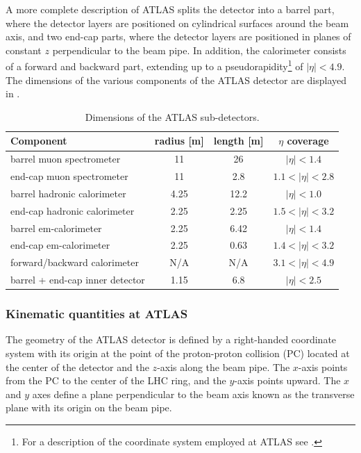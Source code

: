 A more complete description of ATLAS splits the detector
into a barrel part, where the detector layers
are positioned on cylindrical surfaces around the beam axis, and two end-cap parts,
where the detector layers are positioned in planes of constant $z$ perpendicular
to the beam pipe. In addition, the calorimeter consists of a forward 
and backward part, extending up to a pseudorapidity\footnote{For a description
of the coordinate system employed at ATLAS see .} 
of $|\eta| < 4.9$. The dimensions of the various components of the ATLAS detector
are displayed in .

\begin{table}[htbp]
  \begin{center}
    \begin{tabular}{|l|ccc|}
    \hline
    Component & radius [m] & length [m] & $\eta$ coverage \\
    \hline
    barrel muon spectrometer &  11 & 26 & $|\eta| < 1.4$ \\
    end-cap muon spectrometer & 11 & 2.8 & $1.1 < |\eta| < 2.8$ \\
    \hline
    barrel hadronic calorimeter & 4.25 & 12.2 & $|\eta| < 1.0$ \\
    end-cap hadronic calorimeter & 2.25 & 2.25 & $1.5 < |\eta| < 3.2$ \\
    \hline
    barrel em-calorimeter & 2.25 & 6.42 & $|\eta| < 1.4$ \\
    end-cap em-calorimeter & 2.25 & 0.63 & $1.4 < |\eta| < 3.2$ \\
    forward/backward calorimeter & N/A & N/A & $3.1 < |\eta| < 4.9$ \\
    \hline
    barrel + end-cap inner detector & 1.15 & 6.8 & $|\eta| < 2.5$ \\
    \hline
    \end{tabular}
    \caption{Dimensions of the ATLAS sub-detectors.}
    \label{tab:atlasdim}
  \end{center}
\end{table}

\subsubsection{Kinematic quantities at ATLAS}
\label{subsubsec:kinematics}

The geometry of the ATLAS detector is defined
by a right-handed coordinate system with its origin at the point of
the proton-proton collision (PC) located at the center of the detector 
and the $z$-axis along the beam pipe. 
The $x$-axis points from the PC to the center of the LHC 
ring, and the $y$-axis points upward. The $x$ and $y$ axes define
a plane perpendicular to the beam axis known as the transverse plane with
its origin on the beam pipe.

